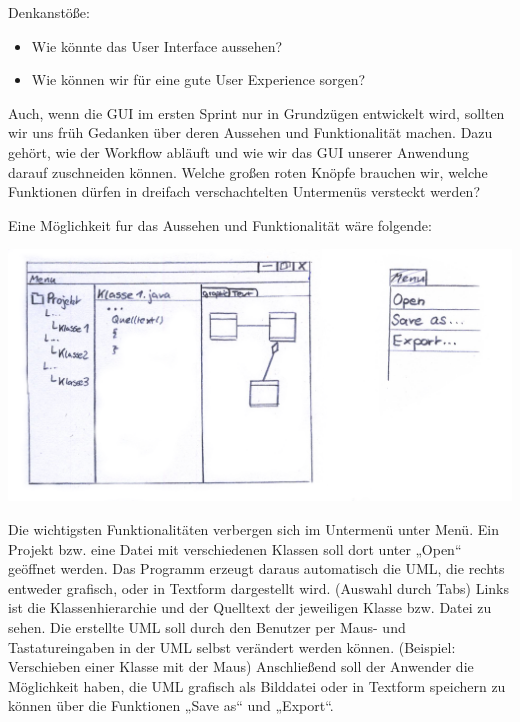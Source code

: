 Denkanstöße:
\begin{itemize}
\item Wie könnte das User Interface aussehen?

\item Wie können wir für eine gute User Experience sorgen?
\end{itemize}
Auch, wenn die GUI im ersten Sprint nur in Grundzügen entwickelt wird, sollten wir uns früh Gedanken über deren Aussehen und Funktionalität machen. Dazu gehört, wie der Workflow abläuft und wie wir das GUI unserer Anwendung darauf zuschneiden können. Welche großen roten Knöpfe brauchen wir, welche Funktionen dürfen in dreifach verschachtelten Untermenüs versteckt werden?

Eine Möglichkeit fur das Aussehen und Funktionalität wäre folgende:

\includegraphics[]{Bilder/GUI-Beispiel.png}

Die wichtigsten Funktionalitäten verbergen sich im Untermenü unter Menü.
Ein Projekt bzw. eine Datei mit verschiedenen Klassen soll dort unter „Open“ geöffnet werden.
Das Programm erzeugt daraus automatisch die UML, die rechts entweder grafisch, oder in Textform dargestellt wird. (Auswahl durch Tabs)
Links ist die Klassenhierarchie und der Quelltext der jeweiligen Klasse bzw. Datei zu sehen.
Die erstellte UML soll durch den Benutzer per Maus- und Tastatureingaben in der UML selbst verändert werden können. (Beispiel: Verschieben einer Klasse mit der Maus)
Anschließend soll der Anwender die Möglichkeit haben, die UML grafisch als Bilddatei oder in Textform speichern zu können über die Funktionen „Save as“ und „Export“.
\nsecend